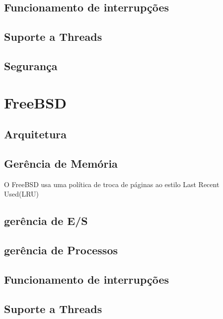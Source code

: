 \documentclass[conference]{IEEEtran}
\begin{document}
\subsection{Funcionamento de interrupções}\label{sec:LinuxInt}

\subsection{Suporte a Threads}\label{sec:TinuxThreads}

\subsection{Segurança}\label{sec:LinuxSec}

\section{FreeBSD}\label{sec:BSD}

\subsection{Arquitetura}\label{sec:BSDArq}

\subsection{Gerência de Memória}\label{sec:BSDMem}
O FreeBSD usa uma política de troca de páginas ao estilo Last Recent Used(LRU)\cite{FreeBsdArc}

\subsection{gerência de E/S}\label{sec:BSDES}

\subsection{gerência de Processos}\label{sec:BSDPROC}

\subsection{Funcionamento de interrupções}\label{sec:BSDInt}

\subsection{Suporte a Threads}\label{sec:BSDThreads}
\end{document}
